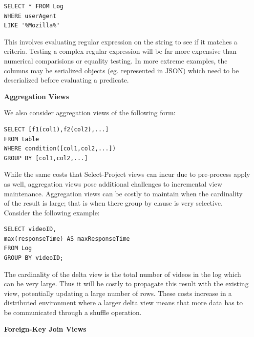 \begin{lstlisting}
SELECT * FROM Log 
WHERE userAgent 
LIKE '%Mozilla%'
\end{lstlisting}

This involves evaluating regular expression on the string to see if
it matches a criteria.
Testing a complex regular expression will be far more expensive than
numerical comparisions or equality testing. In more extreme examples,
the columns may be serialized objects (eg. represented in JSON) which
need to be deserialized before evaluating a predicate.



\vspace{1em}

\noindent\textbf{Aggregation Views}

We also consider aggregation views of the following form:

\begin{lstlisting}
SELECT [f1(col1),f2(col2),...] 
FROM table 
WHERE condition([col1,col2,...]) 
GROUP BY [col1,col2,...]
\end{lstlisting}

While the same costs that Select-Project views can incur due to pre-process
apply as well, aggregation views pose additional challenges to incremental
view maintenance. Aggregation views can be costly to maintain when
the cardinality of the result is large; that is when there group by
clause is very selective. Consider the following example:

\begin{lstlisting}
SELECT videoID, 
max(responseTime) AS maxResponseTime 
FROM Log 
GROUP BY videoID;
\end{lstlisting}

The cardinality of the delta view is the total number of videos in the log which can be very large.
Thus it will be costly to propagate this result with the existing view, potentially updating a large number of rows. 
These costs increase in a distributed environment where a larger
delta view means that more data has to be communicated through a shuffle
operation. 

\vspace{1em}

\noindent\textbf{Foreign-Key Join Views}

